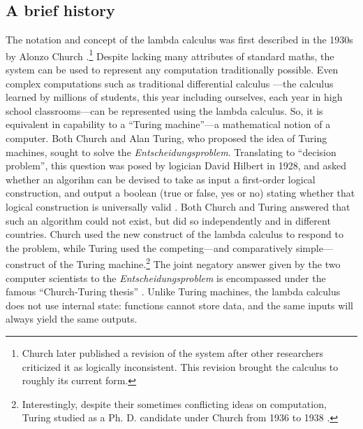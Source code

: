 \documentclass[twocolumn,titlepage,12pt]{article}
\begin{document}
\subsection{A brief history}
The notation and concept of the lambda calculus was first described in the 1930s by Alonzo Church \cite{church}.\footnote{Church later published a revision \cite{church2} of the system after other researchers\cite{logicallyinconsistent} criticized it as logically inconsistent. This revision brought the calculus to roughly its current form.} Despite lacking many attributes of standard maths, the system can be used to represent any computation traditionally possible. Even complex computations such as traditional differential calculus \cite{differentiallc}---the calculus learned by millions of students, this year including ourselves, each year in high school classrooms---can be represented using the lambda calculus. So, it is equivalent in capability to a ``Turing machine''---a mathematical notion of a computer. Both Church and Alan Turing, who proposed the idea of Turing machines, sought to solve the \textit{Entscheidungsproblem}. Translating to ``decision problem'', this question was posed by logician David Hilbert in 1928, and asked whether an algorihm can be devised to take as input a first-order logical construction, and output a boolean (true or false, yes or no) stating whether that logical construction is universally valid \cite{hilbert}. Both Church and Turing answered that such an algorithm could not exist, but did so independently and in different countries. Church used the new construct of the lambda calculus to respond to the problem, while Turing used the competing---and comparatively simple---construct of the Turing machine.\footnote{Interestingly, despite their sometimes conflicting ideas on computation, Turing studied as a Ph. D. candidate under Church from 1936 to 1938 \cite{churchpapers}.} The joint negatory answer given by the two computer scientists to the \textit{Entscheidungsproblem} is encompassed under the famous ``Church-Turing thesis'' \cite{churchturingthesis}. Unlike Turing machines, the lambda calculus does not use internal state: functions cannot store data, and the same inputs will always yield the same outputs.
\end{document}
